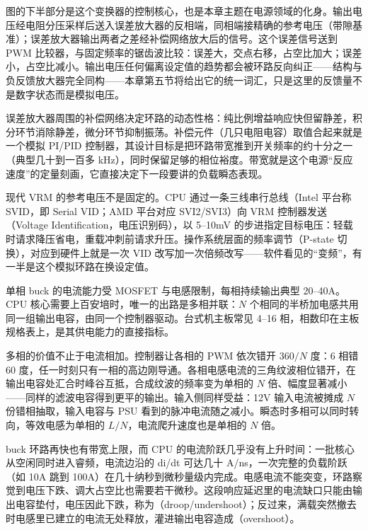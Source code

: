 
图的下半部分是这个变换器的控制核心，也是本章主题在电源领域的化身。输出电压经电阻分压采样后送入误差放大器的反相端，同相端接精确的参考电压（带隙基准）；误差放大器输出两者之差经补偿网络放大后的信号。这个误差信号送到 PWM 比较器，与固定频率的锯齿波比较：误差大，交点右移，占空比加大；误差小，占空比减小。输出电压任何偏离设定值的趋势都会被环路反向纠正——结构与负反馈放大器完全同构——本章第五节将给出它的统一词汇，只是这里的反馈量不是数字状态而是模拟电压。

误差放大器周围的补偿网络决定环路的动态性格：纯比例增益响应快但留静差，积分环节消除静差，微分环节抑制振荡。补偿元件（几只电阻电容）取值合起来就是一个模拟 PI/PID 控制器，其设计目标是把环路带宽推到开关频率的约十分之一（典型几十到一百多 kHz），同时保留足够的相位裕度。带宽就是这个电源“反应速度”的定量刻画，它直接决定下一段要讲的负载瞬态表现。

现代 VRM 的参考电压不是固定的。CPU 通过一条三线串行总线（Intel 平台称 SVID，即 Serial VID；AMD 平台对应 SVI2/SVI3）向 VRM 控制器发送 （Voltage Identification，电压识别码），以 5--10mV 的步进指定目标电压：轻载时请求降压省电，重载冲刺前请求升压。操作系统层面的频率调节（P-state 切换），对应到硬件上就是一次 VID 改写加一次倍频改写——软件看见的“变频”，有一半是这个模拟环路在换设定值。


单相 buck 的电流能力受 MOSFET 与电感限制，每相持续输出典型 20--40A。CPU 核心需要上百安培时，唯一的出路是多相并联：$N$ 个相同的半桥加电感共用同一组输出电容，由同一个控制器驱动。台式机主板常见 4--16 相，相数印在主板规格表上，是其供电能力的直接指标。

多相的价值不止于电流相加。控制器让各相的 PWM 依次错开 $360/N$ 度：6 相错 60 度，任一时刻只有一相的高边刚导通。各相电感电流的三角纹波相位错开，在输出电容处汇合时峰谷互抵，合成纹波的频率变为单相的 $N$ 倍、幅度显著减小——同样的滤波电容得到更平的输出。输入侧同样受益：12V 输入电流被摊成 $N$ 份错相抽取，输入电容与 PSU 看到的脉冲电流随之减小。瞬态时多相可以同时转向，等效电感为单相的 $L/N$，电流爬升速度也是单相的 $N$ 倍。


buck 环路再快也有带宽上限，而 CPU 的电流阶跃几乎没有上升时间：一批核心从空闲同时进入睿频，电流边沿的 di/dt 可达几十 A/ns，一次完整的负载阶跃（如 10A 跳到 100A）在几十纳秒到微秒量级内完成。电感电流不能突变，环路察觉到电压下跌、调大占空比也需要若干微秒。这段响应延迟里的电流缺口只能由输出电容垫付，电压因此下跌，称为（droop/undershoot）；反过来，满载突然撤去时电感里已建立的电流无处释放，灌进输出电容造成（overshoot）。


